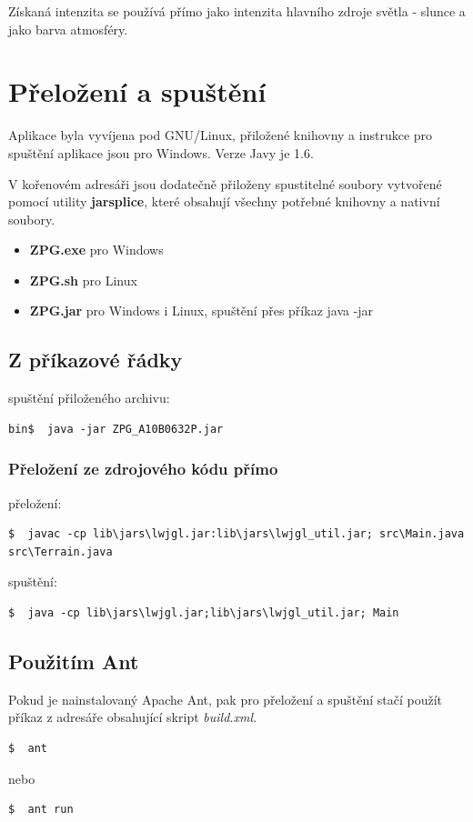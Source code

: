 \documentclass[11pt]{article}
\begin{document}
Získaná intenzita se používá přímo jako intenzita hlavního zdroje světla - slunce a jako barva atmosféry.

\clearpage
\section{Přeložení a spuštění}
Aplikace byla vyvíjena pod GNU/Linux, přiložené knihovny a instrukce pro
spuštění aplikace jsou pro Windows. Verze Javy je 1.6.

V kořenovém adresáři jsou dodatečně přiloženy spustitelné soubory vytvořené
pomocí utility \textbf{jarsplice}, které obsahují všechny potřebné knihovny a
nativní soubory.
\begin{itemize}
	\item \textbf{ZPG.exe} pro Windows
	\item \textbf{ZPG.sh} pro Linux
	\item \textbf{ZPG.jar} pro Windows i Linux, spuštění přes příkaz java -jar
\end{itemize}

\subsection{Z příkazové řádky}
spuštění přiloženého archivu:
\begin{verbatim}
bin$  java -jar ZPG_A10B0632P.jar
\end{verbatim}

\subsubsection{Přeložení ze zdrojového kódu přímo}
přeložení:
\begin{verbatim}
$  javac -cp lib\jars\lwjgl.jar:lib\jars\lwjgl_util.jar; src\Main.java
src\Terrain.java
\end{verbatim}
spuštění:
\begin{verbatim}
$  java -cp lib\jars\lwjgl.jar;lib\jars\lwjgl_util.jar; Main
\end{verbatim}


\subsection{Použitím Ant}
Pokud je nainstalovaný Apache Ant, pak pro přeložení a spuštění stačí použít příkaz z adresáře obsahující skript \textit{build.xml}.
\begin{verbatim}
$  ant
\end{verbatim}
nebo 
\begin{verbatim}
$  ant run
\end{verbatim}
\end{document}
